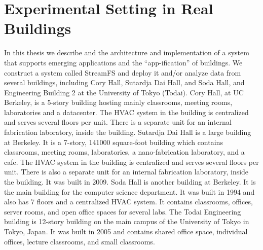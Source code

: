 \section{Experimental Setting in Real Buildings}
In this thesis we describe and the architecture and implementation of a system that supports emerging applications and the ``app-ification''
of buildings.  We construct a system called StreamFS and deploy it and/or analyze data from several buildings, including
Cory Hall, Sutardja Dai Hall, and Soda Hall, and Engineering Building 2 at the University of Tokyo (Todai).
Cory Hall, at UC Berkeley, is a 5-story building hosting mainly classrooms, meeting rooms, laboratories and a datacenter.
The HVAC system in the building is centralized and serves several floors per unit.
There is a separate unit for an internal fabrication laboratory, inside the building.
Sutardja Dai Hall is a large building at Berkeley.  It is a 7-story, 141000 square-foot 
 building which contains classrooms, meeting rooms, laboratories, a nano-fabrication laboratory, and a cafe.
The HVAC system in the building is centralized and serves several floors per unit.
There is also a separate unit for an internal fabrication laboratory, inside the building.  It was built in 2009.
Soda Hall is another building at Berkeley.  It is the main building for the computer science department.
It was built in 1994 and also has 7 floors and a centralized HVAC system.  It contains classrooms, 
offices, server rooms, and open office spaces for several labs.
The Todai Engineering building is 12-story building on the main campus of the University of Tokyo in Tokyo, Japan.
It was built in 2005 and contains shared office space, individual offices, lecture classrooms, and small
classrooms.

